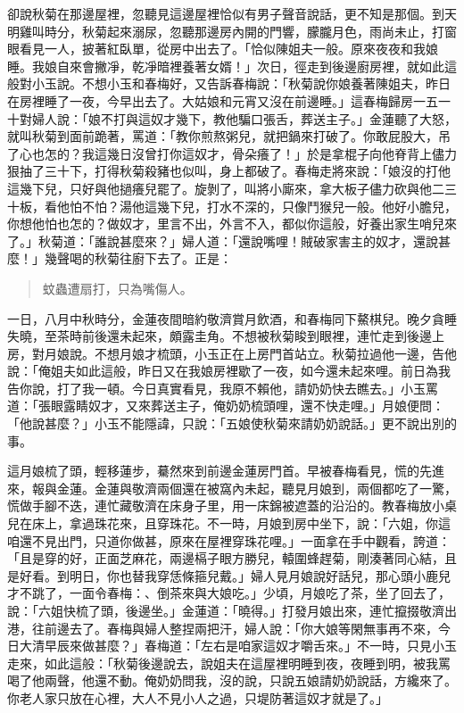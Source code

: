卻說秋菊在那邊屋裡，忽聽見這邊屋裡恰似有男子聲音說話，更不知是那個。到天明雞叫時分，秋菊起來溺尿，忽聽那邊房內開的門響，朦朧月色，雨尚未止，打窗眼看見一人，披著紅臥單，從房中出去了。「恰似陳姐夫一般。原來夜夜和我娘睡。我娘自來會撇凈，乾凈暗裡養著女婿！」次日，徑走到後邊廚房裡，就如此這般對小玉說。不想小玉和春梅好，又告訴春梅說：「秋菊說你娘養著陳姐夫，昨日在房裡睡了一夜，今早出去了。大姑娘和元宵又沒在前邊睡。」這春梅歸房一五一十對婦人說：「娘不打與這奴才幾下，教他騙口張舌，葬送主子。」金蓮聽了大怒，就叫秋菊到面前跪著，罵道：「教你煎熬粥兒，就把鍋來打破了。你敢屁股大，吊了心也怎的？我這幾日沒曾打你這奴才，骨朵癢了！」於是拿棍子向他脊背上儘力狠抽了三十下，打得秋菊殺豬也似叫，身上都破了。春梅走將來說：「娘沒的打他這幾下兒，只好與他撾癢兒罷了。旋剝了，叫將小廝來，拿大板子儘力砍與他二三十板，看他怕不怕？湯他這幾下兒，打水不深的，只像鬥猴兒一般。他好小膽兒，你想他怕也怎的？做奴才，里言不出，外言不入，都似你這般，好養出家生哨兒來了。」秋菊道：「誰說甚麼來？」婦人道：「還說嘴哩！賊破家害主的奴才，還說甚麼！」幾聲喝的秋菊往廚下去了。正是：
\begin{quote}
蚊蟲遭扇打，只為嘴傷人。
\end{quote}

一日，八月中秋時分，金蓮夜間暗約敬濟賞月飲酒，和春梅同下鰲棋兒。晚夕貪睡失曉，至茶時前後還未起來，頗露圭角。不想被秋菊睃到眼裡，連忙走到後邊上房，對月娘說。不想月娘才梳頭，小玉正在上房門首站立。秋菊拉過他一邊，告他說：「俺姐夫如此這般，昨日又在我娘房裡歇了一夜，如今還未起來哩。前日為我告你說，打了我一頓。今日真實看見，我原不賴他，請奶奶快去瞧去。」小玉罵道：「張眼露睛奴才，又來葬送主子，俺奶奶梳頭哩，還不快走哩。」月娘便問：「他說甚麼？」小玉不能隱諱，只說：「五娘使秋菊來請奶奶說話。」更不說出別的事。

這月娘梳了頭，輕移蓮步，驀然來到前邊金蓮房門首。早被春梅看見，慌的先進來，報與金蓮。金蓮與敬濟兩個還在被窩內未起，聽見月娘到，兩個都吃了一驚，慌做手腳不迭，連忙藏敬濟在床身子里，用一床錦被遮蓋的沿沿的。教春梅放小桌兒在床上，拿過珠花來，且穿珠花。不一時，月娘到房中坐下，說：「六姐，你這咱還不見出門，只道你做甚，原來在屋裡穿珠花哩。」一面拿在手中觀看，誇道：「且是穿的好，正面芝麻花，兩邊槅子眼方勝兒，轅圍蜂趕菊，剛湊著同心結，且是好看。到明日，你也替我穿恁條箍兒戴。」婦人見月娘說好話兒，那心頭小鹿兒才不跳了，一面令春梅：、倒茶來與大娘吃。」少頃，月娘吃了茶，坐了回去了，說：「六姐快梳了頭，後邊坐。」金蓮道：「曉得。」打發月娘出來，連忙攛掇敬濟出港，往前邊去了。春梅與婦人整捏兩把汗，婦人說：「你大娘等閑無事再不來，今日大清早辰來做甚麼？」春梅道：「左右是咱家這奴才嚼舌來。」不一時，只見小玉走來，如此這般：「秋菊後邊說去，說姐夫在這屋裡明睡到夜，夜睡到明，被我罵喝了他兩聲，他還不動。俺奶奶問我，沒的說，只說五娘請奶奶說話，方纔來了。你老人家只放在心裡，大人不見小人之過，只堤防著這奴才就是了。」

